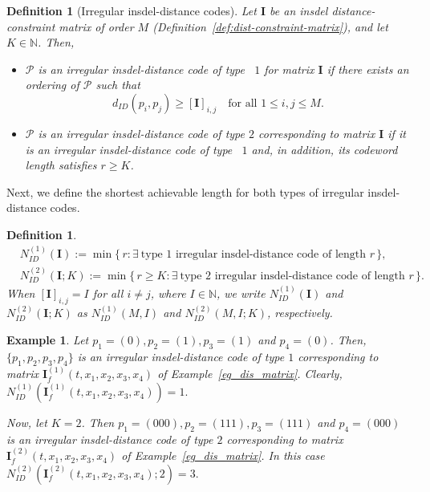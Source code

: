 \documentclass[11 pt]{article}
\numberwithin{equation}{section}
\newtheorem{definition}[theorem]{Definition}
\newtheorem{example}[theorem]{Example}
\begin{document}
    \begin{definition}[Irregular insdel-distance codes]
    \label{IIDC}
        Let $\mathbf{I}$ be an insdel distance-constraint matrix of order $M$ (Definition~\ref{def:dist-constraint-matrix}), and let $K \in \mathbb{N}$.
        Then,
        \begin{itemize}
          \item $\mathcal{P}$ is an irregular insdel-distance code of type~ $1$ for matrix $\mathbf{I}$ if there exists an ordering of $\mathcal{P}$ such that
          \[
            d_{ID}(p_i,p_j) \ge [\bm{I}]_{i,j} \quad \text{for all } 1\le i,j\le M.
          \]
          \item $\mathcal{P}$ is an irregular insdel-distance code of type $2$ corresponding to matrix $\mathbf{I}$ if it is an irregular insdel-distance code of type~ $1$ and, in addition, its codeword length satisfies $r \ge K$.
        \end{itemize}
    \end{definition}

    Next, we define the shortest achievable length for both types of irregular insdel-distance codes.
    
    \begin{definition}
       \begin{align*}
            &N^{(1)}_{ID}(\bm{I})
                := \min\{\, r : \exists\ \text{type 1 irregular insdel-distance code of length } r \,\},\\[4pt]
            &N^{(2)}_{ID}(\bm{I};K)
                := \min\{\, r \ge K : \exists\ \text{type 2 irregular insdel-distance code of length } r \,\}.
        \end{align*}
        When $[\bm{I}]_{i,j} = I$ for all $i \neq j$, where $I \in \mathbb{N}$, we write $N^{(1)}_{ID}(\bm{I})$ and $N^{(2)}_{{ID}}(\bm{I};K)$ as $N^{(1)}_{ID}(M,I)$ and $N^{(2)}_{{ID}}(M,I;K)$,  respectively.
    \end{definition}

    \begin{example}\label{eg_irregular_code}
        Let $p_1 = (0) , p_2 = (1), p_3 = (1)$ and $p_4 = (0)$. Then, $\{p_1, p_2, p_3, p_4\}$ is an irregular insdel-distance code of type $1$ corresponding to matrix $\textbf{I}_f^{(1)}(t, x_1,x_2,x_3,x_4)$ of Example~\ref{eg_dis_matrix}. Clearly,  $N^{(1)}_{{ID}}(\textbf{I}_f^{(1)}(t, x_1,x_2,x_3,x_4)) = 1.$

        \smallskip
        \noindent Now, let $K = 2$. Then $p_1 = (000) , p_2 = (111), p_3 = (111)$ and $p_4 = (000)$ is an irregular insdel-distance code of type $2$ corresponding to matrix $\textbf{I}_f^{(2)}(t, x_1,x_2,x_3,x_4)$ of Example~\ref{eg_dis_matrix}. In this case $N^{(2)}_{{ID}}(\textbf{I}_f^{(2)}(t, x_1,x_2,x_3,x_4);2) = 3.$
    \end{example}
    
\end{document}
